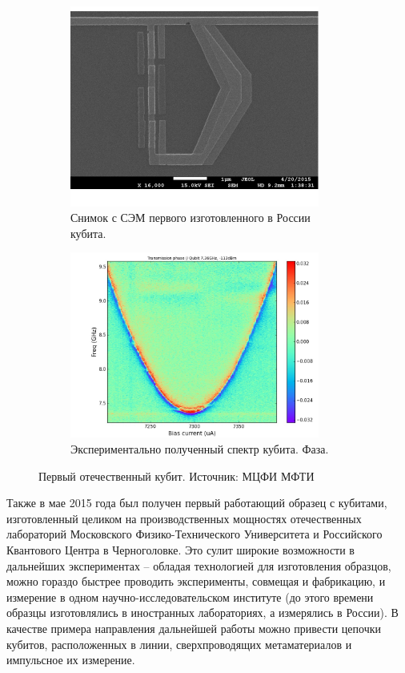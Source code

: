 \documentclass[12pt, twoside]{report}
\numberwithin{equation}{section}
\numberwithin{figure}{section}
\begin{document}
\begin{figure}[h]
\centering
\begin{subfigure}[t]{0.45\textwidth}
\includegraphics[width=0.9\textwidth]{Pictures/new_qubit}
\caption{Снимок с СЭМ первого изготовленного в России кубита.}
\end{subfigure}
\begin{subfigure}[t]{0.5\textwidth}
\includegraphics[width=0.9\textwidth]{Pictures/new_spectrum}
\caption{Экспериментально полученный спектр кубита. Фаза.}
\end{subfigure}
\caption{Первый отечественный кубит. Источник: МЦФИ МФТИ}
\end{figure}

Также в мае 2015 года был получен первый работающий образец с кубитами, изготовленный целиком на производственных мощностях отечественных лабораторий Московского Физико-Технического Университета и Российского Квантового Центра в Черноголовке. Это сулит широкие возможности в дальнейших экспериментах -- обладая технологией для изготовления образцов, можно гораздо быстрее проводить эксперименты, совмещая и фабрикацию, и измерение в одном научно-исследовательском институте (до этого времени образцы изготовлялись в иностранных лабораториях, а измерялись в России). В качестве примера направления дальнейшей работы можно привести цепочки кубитов, расположенных в линии, сверхпроводящих метаматериалов и импульсное их измерение.
\end{document}
